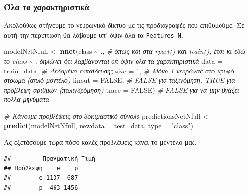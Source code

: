 \documentclass[
]{article}
\newenvironment{Shaded}{\begin{snugshade}}{\end{snugshade}}
\newcommand{\AttributeTok}[1]{\textcolor[rgb]{0.13,0.29,0.53}{#1}}
\newcommand{\CommentTok}[1]{\textcolor[rgb]{0.56,0.35,0.01}{\textit{#1}}}
\newcommand{\ConstantTok}[1]{\textcolor[rgb]{0.56,0.35,0.01}{#1}}
\newcommand{\DecValTok}[1]{\textcolor[rgb]{0.00,0.00,0.81}{#1}}
\newcommand{\FunctionTok}[1]{\textcolor[rgb]{0.13,0.29,0.53}{\textbf{#1}}}
\newcommand{\NormalTok}[1]{#1}
\newcommand{\OtherTok}[1]{\textcolor[rgb]{0.56,0.35,0.01}{#1}}
\newcommand{\SpecialCharTok}[1]{\textcolor[rgb]{0.81,0.36,0.00}{\textbf{#1}}}
\newcommand{\StringTok}[1]{\textcolor[rgb]{0.31,0.60,0.02}{#1}}
\begin{document}
\subsubsection{Όλα τα
χαρακτηριστικά}\label{ux3ccux3bbux3b1-ux3c4ux3b1-ux3c7ux3b1ux3c1ux3b1ux3baux3c4ux3b7ux3c1ux3b9ux3c3ux3c4ux3b9ux3baux3ac}

Ακολούθως στήνουμε το νευρωνικό δίκτυο με τις προδιαγραφές που
επιθυμούμε. Σε αυτή την περίπτωση θα λάβουμε υπ' όψιν όλα τα
\texttt{Features\_N}.

\begin{Shaded}
\begin{Highlighting}[]
\NormalTok{modelNetNfull }\OtherTok{\textless{}{-}} \FunctionTok{nnet}\NormalTok{(class }\SpecialCharTok{\textasciitilde{}}\NormalTok{ .,  }\CommentTok{\# όπως και στα rpart() και teain(), έτσι κι εδώ το class \textasciitilde{} . δηλώνει ότι λαμβάνονται υπ\textquotesingle{} όψιν όλα τα χαρακτηριστικά}
               \AttributeTok{data =}\NormalTok{ train\_data,  }\CommentTok{\# Δεδομένα εκπαίδευσης}
               \AttributeTok{size =} \DecValTok{1}\NormalTok{,  }\CommentTok{\# Μόνο 1 νευρώνας στο κρυφό στρώμα (απλό μοντέλο)}
               \AttributeTok{linout =} \ConstantTok{FALSE}\NormalTok{,  }\CommentTok{\# FALSE για ταξινόμηση. TRUE για πρόβλεψη αριθμών (παλινδρόμηση)}
               \AttributeTok{trace =} \ConstantTok{FALSE}\NormalTok{)  }\CommentTok{\# FALSE για να μην βγάζει πολλά μηνύματα}

\CommentTok{\# Κάνουμε προβλέψεις στο δοκιμαστικό σύνολο}
\NormalTok{predictionsNetNfull }\OtherTok{\textless{}{-}} \FunctionTok{predict}\NormalTok{(modelNetNfull, }\AttributeTok{newdata =}\NormalTok{ test\_data, }\AttributeTok{type =} \StringTok{"class"}\NormalTok{)}
\end{Highlighting}
\end{Shaded}

Ας εξετάσουμε τώρα πόσο καλές προβλέψεις κάνει το μοντέλο μας.

\begin{Shaded}
\end{Shaded}

\begin{verbatim}
##         Πραγματική_Τιμή
## Πρόβλεψη    e    p
##        e 1137  687
##        p  463 1456
\end{verbatim}
\end{document}

